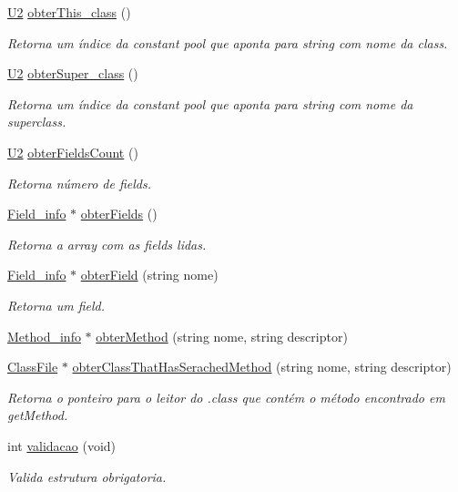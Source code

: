 \begin{DoxyCompactItemize}
\hyperlink{BasicTypes_8h_a90240657108b1b457eef9d3f76e0202e}{U2} \hyperlink{classClassFile_aec88c5432526d16b546ed59e5cec2136}{obter\+This\+\_\+class} ()
\begin{DoxyCompactList}\small\item\em Retorna um índice da constant pool que aponta para string com nome da class. \end{DoxyCompactList}\item 
\hyperlink{BasicTypes_8h_a90240657108b1b457eef9d3f76e0202e}{U2} \hyperlink{classClassFile_a8f248001f388181db10e76602031d560}{obter\+Super\+\_\+class} ()
\begin{DoxyCompactList}\small\item\em Retorna um índice da constant pool que aponta para string com nome da superclass. \end{DoxyCompactList}\item 
\hyperlink{BasicTypes_8h_a90240657108b1b457eef9d3f76e0202e}{U2} \hyperlink{classClassFile_a0be559cd8b7b3168c81a2782e4facb0c}{obter\+Fields\+Count} ()
\begin{DoxyCompactList}\small\item\em Retorna número de fields. \end{DoxyCompactList}\item 
\hyperlink{structField__info}{Field\+\_\+info} $\ast$ \hyperlink{classClassFile_ac3aabaa918413884416692b29165b463}{obter\+Fields} ()
\begin{DoxyCompactList}\small\item\em Retorna a array com as fields lidas. \end{DoxyCompactList}\item 
\hyperlink{structField__info}{Field\+\_\+info} $\ast$ \hyperlink{classClassFile_a1ae90b1662ca222c9910c14997b20eaa}{obter\+Field} (string nome)
\begin{DoxyCompactList}\small\item\em Retorna um field. \end{DoxyCompactList}\item 
\hyperlink{structMethod__info}{Method\+\_\+info} $\ast$ \hyperlink{classClassFile_aac49e7e39f677987b53fdf15787b8106}{obter\+Method} (string nome, string descriptor)
\item 
\hyperlink{classClassFile}{Class\+File} $\ast$ \hyperlink{classClassFile_a4d0ac62c4d6218ddada33f715ebaf633}{obter\+Class\+That\+Has\+Serached\+Method} (string nome, string descriptor)
\begin{DoxyCompactList}\small\item\em Retorna o ponteiro para o leitor do .class que contém o método encontrado em get\+Method. \end{DoxyCompactList}\item 
int \hyperlink{classClassFile_acdb7018a6926b187bc6ecc18abf0fff8}{validacao} (void)
\begin{DoxyCompactList}\small\item\em Valida estrutura obrigatoria. \end{DoxyCompactList}\end{DoxyCompactItemize}
